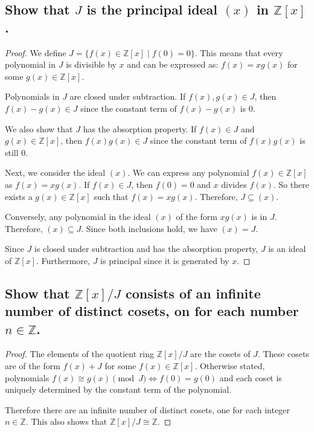 \documentclass{article}
\theoremstyle{plain} %
\theoremstyle{definition} %
\begin{document}
\subsection*{Show that $J$ is the principal ideal $(x)$ in $\mathbb{Z}[x]$.}
\begin{proof}
    We define $J = \{f(x) \in \mathbb{Z}[x] \mid f(0) = 0\}$. This means that
    every polynomial in $J$ is divisible by $x$ and can be expressed as: $f(x) = xg(x)$ for some $g(x) \in \mathbb{Z}[x]$.

    Polynomials in $J$ are closed under subtraction. If $f(x), g(x) \in J$, then $f(x) - g(x) \in J$ since the
    constant term of $f(x) - g(x)$ is $0$.

    We also show that $J$ has the absorption property. If $f(x) \in J$ and $g(x) \in \mathbb{Z}[x]$, then $f(x)g(x) \in J$ since the
    constant term of $f(x)g(x)$ is still $0$.

    Next, we consider the ideal $(x)$. We can express any polynomial $f(x) \in \mathbb{Z}[x]$ as $f(x) = xg(x)$. 
    If $f(x) \in J$, then $f(0) = 0$ and $x$ divides $f(x)$. So there exists a $g(x) \in \mathbb{Z}[x]$ such that $f(x) = xg(x)$.
    Therefore, $J \subseteq (x)$.

    Conversely, any polynomial in the ideal $(x)$ of the form $xg(x)$ is in $J$.
    Therefore, $(x) \subseteq J$. Since both inclusions hold, we have $(x) = J$.

    Since $J$ is closed under subtraction and has the absorption property, $J$ is an ideal of $\mathbb{Z}[x]$.
    Furthermore, $J$ is principal since it is generated by $x$.
\end{proof}

\subsection*{Show that $\mathbb{Z}[x]/J$ consists of an infinite number
of distinct cosets, on for each number $n \in \mathbb{Z}$.}
\begin{proof}
    The elements of the quotient ring $\mathbb{Z}[x]/J$ are the cosets of $J$.
    These cosets are of the form $f(x) + J$ for some $f(x) \in \mathbb{Z}[x]$.
    Otherwise stated, polynomials $f(x) \cong g(x) \pmod{J} \iff f(0) = g(0)$ and
    each coset is uniquely determined by the constant term of the polynomial.

    Therefore there are an infinite number of distinct cosets, one for each integer $n \in \mathbb{Z}$.
    This also shows that $\mathbb{Z}[x]/J \cong \mathbb{Z}$.
\end{proof}
\end{document}
